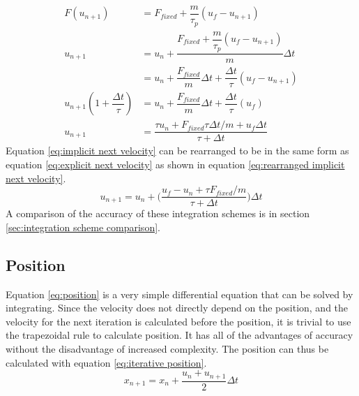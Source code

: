 \documentclass[10pt,a4paper,titlepage]{report}
\begin{document}
\begin{align}
F(u_{n+1}) &= F_{fixed} + \dfrac{m}{\tau_p}(u_f - u_{n+1}) \nonumber \\
u_{n+1} &= u_n + \dfrac{F_{fixed} + \dfrac{m}{\tau_p}(u_f - u_{n+1})}{m}\Delta t \nonumber \\
&= u_n + \dfrac{F_{fixed}}{m}\Delta t + \dfrac{\Delta t}{\tau}(u_f - u_{n+1}) \nonumber \\
u_{n+1} (1 + \dfrac{\Delta t}{\tau}) &= u_n + \dfrac{F_{fixed}}{m}\Delta t + \dfrac{\Delta t}{\tau}(u_f) \nonumber \\
u_{n+1} &= \dfrac{\tau u_n + F_{fixed} \tau \Delta t / m + u_f \Delta t}{\tau + \Delta t} \label{eq:implicit next velocity}
\end{align}
Equation \ref{eq:implicit next velocity} can be rearranged to be in the same form as equation \ref{eq:explicit next velocity} as shown in equation \ref{eq:rearranged implicit next velocity}.
\begin{equation}
u_{n+1} = u_n + \Big(\dfrac{u_f - u_n + \tau F_{fixed} / m}{\tau + \Delta t}\Big)\Delta t
\label{eq:rearranged implicit next velocity}
\end{equation}
A comparison of the accuracy of these integration schemes is in section \ref{sec:integration scheme comparison}.
\subsection{Position}
Equation \ref{eq:position} is a very simple differential equation that can be solved by integrating. Since the velocity does not directly depend on the position, and the velocity for the next iteration is calculated before the position, it is trivial to use the trapezoidal rule to calculate position. It has all of the advantages of accuracy without the disadvantage of increased complexity. The position can thus be calculated with equation \ref{eq:iterative position}.
\begin{equation}
x_{n+1} = x_n + \dfrac{u_n + u_{n+1}}{2}\Delta t
\label{eq:iterative position}
\end{equation}
\end{document}
